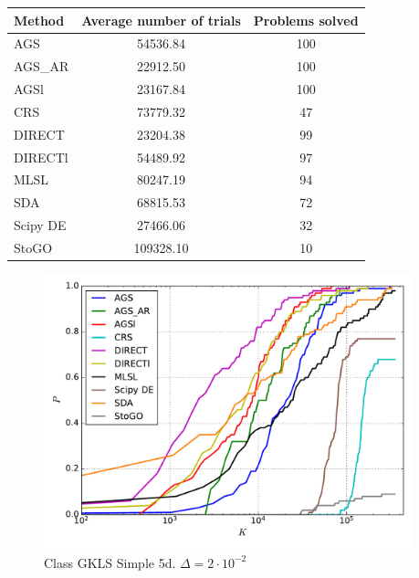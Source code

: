 \documentclass[a4paper]{article}
\begin{document}
\begin{tabular}{lcc}
\hline
 Method   &  Average number of trials  &  Problems solved  \\
\hline
 AGS      &          54536.84          &        100        \\
 AGS\_AR   &          22912.50          &        100        \\
 AGSl     &          23167.84          &        100        \\
 CRS      &          73779.32          &        47         \\
 DIRECT   &          23204.38          &        99         \\
 DIRECTl  &          54489.92          &        97         \\
 MLSL     &          80247.19          &        94         \\
 SDA      &          68815.53          &        72         \\
 Scipy DE &          27466.06          &        32         \\
 StoGO    &         109328.10          &        10         \\
\hline
\end{tabular}
\begin{figure}[H]
  \center
  \includegraphics[width=0.95\textwidth]{../experiments/gklss5d/cmc.pdf}
  \caption{Class GKLS Simple 5d. $\Delta=2\cdot10^{-2}$}
\end{figure}
\end{document}
